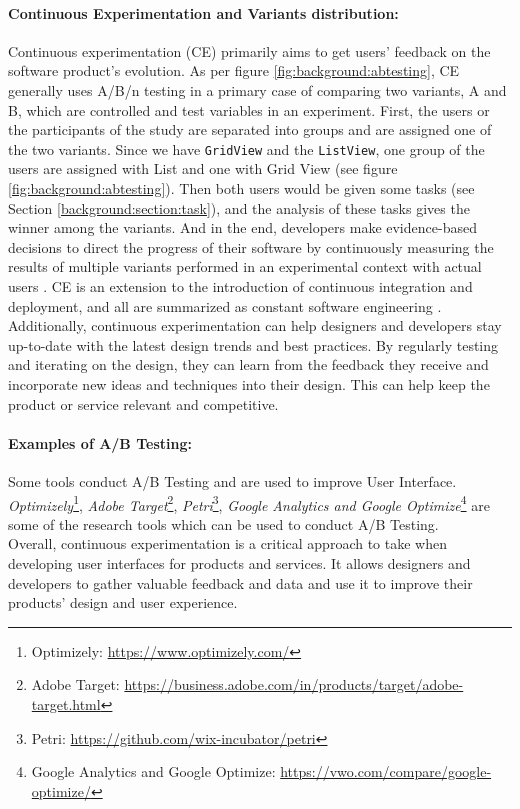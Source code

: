 \paragraph{Continuous Experimentation and Variants distribution:} 
Continuous experimentation (CE) primarily aims to get users' feedback on the software product's evolution.
As per figure \ref{fig:background:abtesting}, CE generally uses A/B/n testing in a primary case of comparing two variants, A and B, which are controlled and test variables in an experiment.
First, the users or the participants of the study are separated into groups and are assigned one of the two variants.
Since we have \texttt{GridView} and the \texttt{ListView}, one group of the users are assigned with List and one with Grid View (see figure \ref{fig:background:abtesting}).
Then both users would be given some tasks (see Section \ref{background:section:task}), and the analysis of these tasks gives the winner among the variants.  
And in the end, developers make evidence-based decisions to direct the progress of their software by continuously measuring the results of multiple variants performed in an experimental context with actual users \cite{article:CE:ros}.
CE is an extension to the introduction of continuous integration and deployment, and all are summarized as constant software engineering \cite{article:CE:fitzgerald}.
Additionally, continuous experimentation can help designers and developers stay up-to-date with the latest design trends and best practices. By regularly testing and iterating on the design, they can learn from the feedback they receive and incorporate new ideas and techniques into their design. 
This can help keep the product or service relevant and competitive.
\paragraph{Examples of A/B Testing:}
Some tools conduct A/B Testing and are used to improve User Interface. \textit{Optimizely}\footnote{Optimizely: \url{https://www.optimizely.com/}}, \textit{Adobe Target}\footnote{Adobe Target: \url{https://business.adobe.com/in/products/target/adobe-target.html}}, \textit{Petri}\footnote{Petri: \url{https://github.com/wix-incubator/petri}}, \textit{Google Analytics and Google Optimize}\footnote{Google Analytics and Google Optimize: \url{https://vwo.com/compare/google-optimize/}} are some of the research tools which can be used to conduct A/B Testing. \\

Overall, continuous experimentation is a critical approach to take when developing user interfaces for products and services. It allows designers and developers to gather valuable feedback and data and use it to improve their products' design and user experience.
\clearpage

